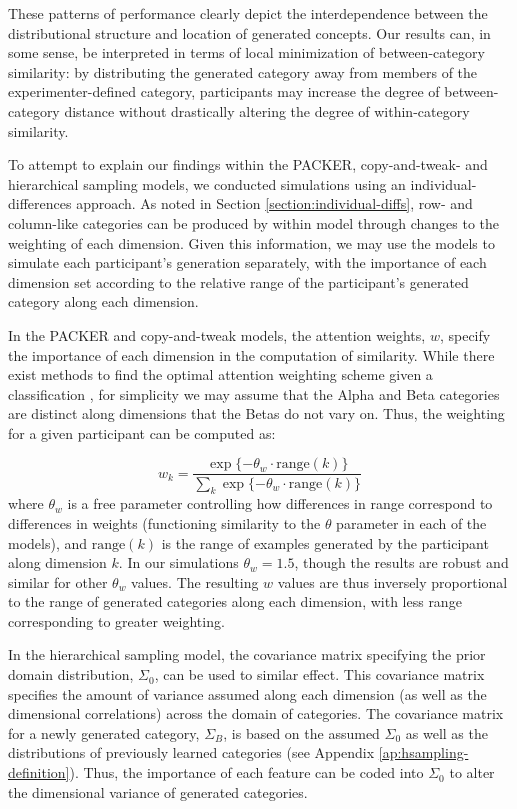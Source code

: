 \documentclass[12pt]{article}
\begin{document}
\begin{flushleft}
These patterns of performance clearly depict the interdependence between the distributional structure and location of generated concepts. Our results can, in some sense, be interpreted in terms of local minimization of between-category similarity: by distributing the generated category away from members of the experimenter-defined category, participants may increase the degree of between-category distance without drastically altering the degree of within-category similarity.

To attempt to explain our findings within the PACKER, copy-and-tweak- and hierarchical sampling models, we conducted simulations using an individual-differences approach. As noted in Section \ref{section:individual-diffs}, row- and column-like categories can be produced by within model through changes to the weighting of each dimension. Given this information, we may use the models to simulate each participant's generation separately, with the importance of each dimension set according to the relative range of the participant's generated category along each dimension. 

In the PACKER and copy-and-tweak models, the attention weights, $w$, specify the importance of each dimension in the computation of similarity. While there exist methods to find the optimal attention weighting scheme given a classification \citep[see][]{vanpaemel2012using}, for simplicity we may assume that the Alpha and Beta categories are distinct along dimensions that the Betas do not vary on. Thus, the weighting for a given participant can be computed as:

\begin{equation}
w_k = \dfrac
{\exp{ \{ -\theta_w \cdot\text{range}(k)}  \} } 
{ \sum_k {\exp{ \{ -\theta_w \cdot\text{range}(k)}  \} } }
\label{eq:range-weight}
\end{equation}
% 
where $\theta_w$ is a free parameter controlling how differences in range correspond to differences in weights (functioning similarity to the $\theta$ parameter in each of the models), and $\text{range}(k)$ is the range of examples generated by the participant along dimension $k$. In our simulations $\theta_w = 1.5$, though the results are robust and similar for other $\theta_w$ values. The resulting $w$ values are thus inversely proportional to the range of generated categories along each dimension, with less range corresponding to greater weighting.

In the hierarchical sampling model, the covariance matrix specifying the prior domain distribution, $\Sigma_0$, can be used to similar effect. This covariance matrix specifies the amount of variance assumed along each dimension (as well as the dimensional correlations) across the domain of categories. The covariance matrix for a newly generated category, $\Sigma_B$, is based on the assumed $\Sigma_0$ as well as the distributions of previously learned categories (see Appendix \ref{ap:hsampling-definition}). Thus, the importance of each feature can be coded into $\Sigma_0$ to alter the dimensional variance of generated categories. 


\end{flushleft}
\end{document}

